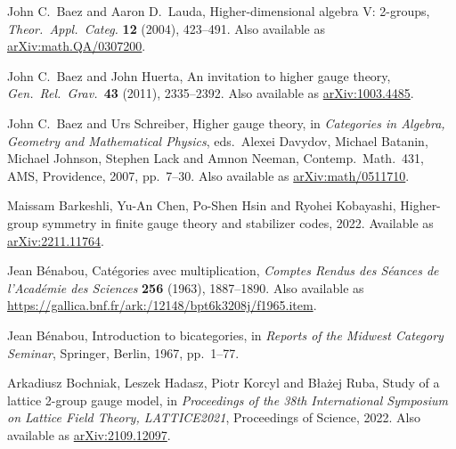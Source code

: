 \documentclass[reqno]{amsart}
\theoremstyle{definition}
\begin{document}
\begin{thebibliography}{99}

John C.\ Baez and Aaron D.\ Lauda, Higher-dimensional algebra {V}: 2-groups, \textsl{Theor.\ Appl.\ Categ.} \textbf{12} (2004), 423--491.
Also available as \href{https://arxiv.org/abs/math.QA/0307200}{arXiv:math.QA/0307200}.

John C.\ Baez and John Huerta, An invitation to higher gauge theory, 
\textsl{Gen.\ Rel.\ Grav.\ }\textbf{43} (2011), 2335--2392.   Also available
as \href{https://arxiv.org/abs/1003.4485}{arXiv:1003.4485}.


John C.\ Baez and Urs Schreiber, Higher gauge theory, in 
\textsl{Categories in Algebra, Geometry and Mathematical Physics}, eds.\ Alexei Davydov, Michael Batanin, Michael Johnson, Stephen Lack and Amnon Neeman, Contemp.\ Math.\ 431, AMS, Providence, 2007, pp.\ 7--30. 
Also available as \href{https://arxiv.org/abs/math/0511710}{arXiv:math/0511710}.

Maissam Barkeshli, Yu-An Chen, Po-Shen Hsin and Ryohei Kobayashi,
Higher-group symmetry in finite gauge theory and stabilizer codes, 2022.
Available as \href{https://arxiv.org/abs/2211.11764}{arXiv:2211.11764}.

Jean B\'enabou, Cat\'egories avec multiplication, \textsl{Comptes Rendus des S\'eances de l'Acad\'emie des Sciences} \textbf{256} (1963), 1887--1890.
Also available as \href{https://gallica.bnf.fr/ark:/12148/bpt6k3208j/f1965.item}{https://gallica.bnf.fr/ark:/12148/bpt6k3208j/f1965.item}.

Jean B{\'e}nabou, Introduction to bicategories, in
\textsl{Reports of the Midwest Category Seminar}, Springer, Berlin,
1967, pp.\ 1--77.

Arkadiusz Bochniak, Leszek Hadasz, Piotr Korcyl and B\l ażej Ruba,
Study of a lattice 2-group gauge model, in \textsl{Proceedings of the 38th International Symposium on Lattice Field Theory, LATTICE2021}, Proceedings of Science, 2022.  Also available as \href{https://arxiv.org/abs/2109.12097}{arXiv:2109.12097}.


\end{thebibliography}
\end{document}
